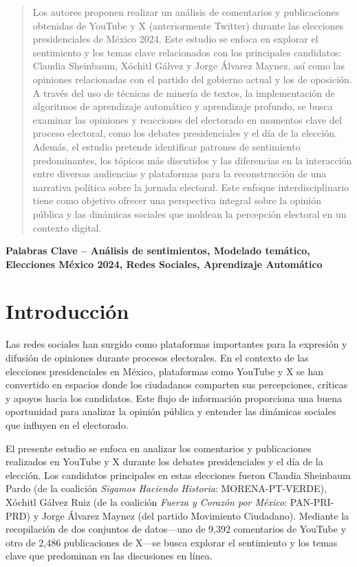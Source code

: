 \documentclass[10pt, a4paper]{article}
\begin{document}
	\newpage
	\maketitle
	\thispagestyle{fancy}
	\begin{abstract}
		Los autores proponen realizar un análisis de comentarios y publicaciones obtenidas de YouTube y X (anteriormente Twitter) durante las elecciones presidenciales de México 2024. Este estudio se enfoca en explorar el sentimiento y los temas clave relacionados con los principales candidatos: Claudia Sheinbaum, Xóchitl Gálvez y Jorge Álvarez Maynez, así como las opiniones relacionadas con el partido del gobierno actual y los de oposición. A través del uso de técnicas de minería de textos, la implementación de algoritmos de aprendizaje automático y aprendizaje profundo, se busca examinar las opiniones y reacciones del electorado en momentos clave del proceso electoral, como los debates presidenciales y el día de la elección. Además, el estudio pretende identificar patrones de sentimiento predominantes, los tópicos más discutidos y las diferencias en la interacción entre diversas audiencias y plataformas para la reconstrucción de una narrativa política sobre la jornada electoral. Este enfoque interdisciplinario tiene como objetivo ofrecer una perspectiva integral sobre la opinión pública y las dinámicas sociales que moldean la percepción electoral en un contexto digital.
	\end{abstract}
	
	\textbf{Palabras Clave -- Análisis de sentimientos, Modelado temático, Elecciones México 2024, Redes Sociales, Aprendizaje Automático}{\mykeywords}
	
	\section{Introducción}
	Las redes sociales han surgido como plataformas importantes para la expresión y difusión de opiniones durante procesos electorales. En el contexto de las elecciones presidenciales en México, plataformas como YouTube y X se han convertido en espacios donde los ciudadanos comparten sus percepciones, críticas y apoyos hacia los candidatos. Este flujo de información proporciona una buena oportunidad para analizar la opinión pública y entender las dinámicas sociales que influyen en el electorado.
	
	El presente estudio se enfoca en analizar los comentarios y publicaciones realizados en YouTube y X durante los debates presidenciales y el día de la elección. Los candidatos principales en estas elecciones fueron Claudia Sheinbaum Pardo (de la coalición \textit{Sigamos Haciendo Historia}: MORENA-PT-VERDE), Xóchitl Gálvez Ruiz (de la coalición \textit{Fuerza y Corazón por México}: PAN-PRI-PRD) y Jorge Álvarez Maynez (del partido Movimiento Ciudadano). Mediante la recopilación de dos conjuntos de datos—uno de 9,392 comentarios de YouTube y otro de 2,486 publicaciones de X—se busca explorar el sentimiento y los temas clave que predominan en las discusiones en línea.
	
\end{document}
